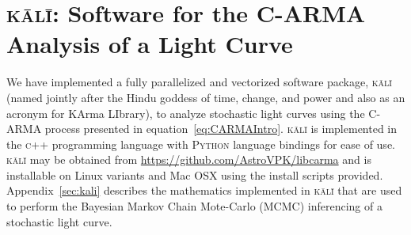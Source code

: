 \documentclass[a4paper,fleqn,usenatbib]{mnras}
\begin{document}



\section[\textsc{k\={a}l\={i}}]{\textsc{k\={a}l\={i}}: Software for the C-ARMA Analysis of a Light Curve}\label{sec:Steps}

We have implemented a fully parallelized and vectorized software package, \textsc{k\={a}l\={i}} (named jointly after the Hindu goddess of time, change, and power and also as an acronym for KArma LIbrary), to analyze stochastic light curves using the C-ARMA process presented in equation~\eqref{eq:CARMAIntro}. \textsc{k\={a}l\={i}} is implemented in the \textsc{c++} programming language with \textsc{Python} language bindings for ease of use. \textsc{k\={a}l\={i}} may be obtained from \url{https://github.com/AstroVPK/libcarma} and is installable on Linux variants and Mac OSX using the install scripts provided. Appendix~\ref{sec:kali} describes the mathematics implemented in \textsc{k\={a}l\={i}} that are used to perform the Bayesian Markov Chain Mote-Carlo (MCMC) inferencing of a stochastic light curve.
\end{document}
